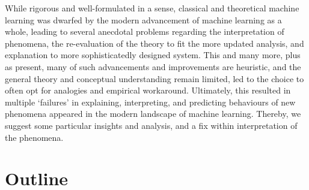 \documentclass[10pt]{article} %
\begin{document}
While rigorous and well-formulated in a sense, classical and theoretical machine learning was dwarfed by the modern advancement of machine learning as a whole, leading to several anecdotal problems regarding the interpretation of phenomena, the re-evaluation of the theory to fit the more updated analysis, and explanation to more sophisticatedly designed system. This and many more, plus as present, many of such advancements and improvements are heuristic, and the general theory and conceptual understanding remain limited, led to the choice to often opt for analogies and empirical workaround. Ultimately, this resulted in multiple `failures' in explaining, interpreting, and predicting behaviours of new phenomena appeared in the modern landscape of machine learning. Thereby, we suggest some particular insights and analysis, and a fix within interpretation of the phenomena. 


\section{Outline}
\end{document}
